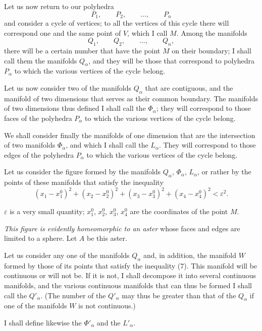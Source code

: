 \documentclass{article}
\begin{document}
Let us now return to our polyhedra
\[ P_{1}, \qquad P_{2}, \qquad \ldots, \qquad P_{n} \]
and consider a cycle of vertices; to all the vertices of this cycle there will correspond one and the same point of $V$, which I call $M$. Among the manifolds
\[ Q_{1}, \qquad Q_{2}, \qquad \ldots, \qquad Q_{n}, \]
there will be a certain number that have the point $M$ on their boundary; I shall call them the manifolds $Q_{\alpha}$, and they will be those that correspond to polyhedra $P_{\alpha}$ to which the various vertices of the cycle belong.

Let us now consider two of the manifolds $Q_{\alpha}$ that are contiguous, and the manifold of two dimensions that serves as their common boundary. The manifolds of two dimensions thus defined I shall call the $\Phi_{\alpha}$; they will correspond to those faces of the polyhedra $P_{\alpha}$ to which the various vertices of the cycle belong.

We shall consider finally the manifolds of one dimension that are the intersection
of two manifolds $\Phi_{\alpha}$, and which I shall call the $L_{\alpha}$. They will correspond to those edges of the polyhedra $P_{\alpha}$ to which the various vertices of the cycle belong.

Let us consider the figure formed by the manifolds $Q_{\alpha}$, $\Phi_{\alpha}$, $L_{\alpha}$, or rather by the points of these manifolds that satisfy the inequality
\[ (x_{1} - x^{0}_{1})^{2} + (x_{2} - x^{0}_{2})^{2} + (x_{3} - x^{0}_{3})^{2} + (x_{4} - x^{0}_{4})^{2} < \varepsilon^{2}. \tag{7} \]

$\varepsilon$ is a very small quantity; $x^{0}_{1}$, $x^{0}_{2}$, $x^{0}_{3}$, $x^{0}_{4}$ are the coordinates of the point $M$.

\emph{This figure is evidently homeomorphic to an aster} whose faces and edges are limited to a sphere. Let $A$ be this aster.

Let us consider any one of the manifolds $Q_{\alpha}$ and, in addition, the manifold $W$ formed by those of its points that satisfy the inequality (7). This manifold will be continuous or will not be. If it is not, I shall decompose it into several continuous manifolds, and the various continuous manifolds that can thus be formed I shall call the $Q'_{\alpha}$. (The number of the $Q'_{\alpha}$ may thus be greater than that of the $Q_{\alpha}$ if one of the manifolds $W$ is not continuous.)

I shall define likewise the $\Phi'_{\alpha}$ and the $L'_{\alpha}$.
\end{document}
